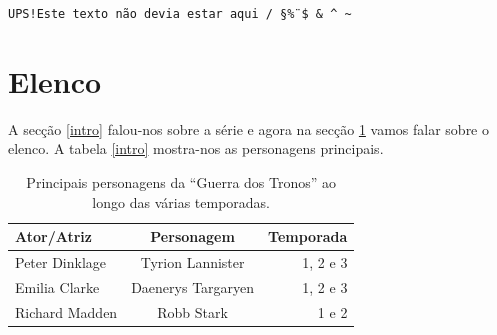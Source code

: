 \documentclass[a4paper,11pt]{report}
\begin{document}
		{\tt UPS!Este texto não devia estar aqui / \S \" \% \$ \& \^{} \~{}}

		\section{Elenco}
		\label{elenco}

		A secção \ref{intro} falou-nos sobre a série e agora na secção \ref{elenco} vamos falar sobre
		o elenco. A tabela \ref{intro} mostra-nos as personagens principais.

\begin{table}[htbp] %
	\centering
	\begin{tabular}{|l|c|r|} %
		\hline %
		\textbf{Ator/Atriz} & \textbf{Personagem}  & \textbf{Temporada} \\
		\hline %
		Peter Dinklage      & Tyrion Lannister   & 1, 2 e 3  \\
		\hline %
		Emilia Clarke       & Daenerys Targaryen & 1, 2 e 3  \\
		\hline %
		Richard Madden      & Robb Stark         & 1 e 2     \\
		\hline %
	\end{tabular}

	\caption{Principais personagens da “Guerra dos Tronos” ao longo das
	várias temporadas.}
\end{table}
\end{document}
